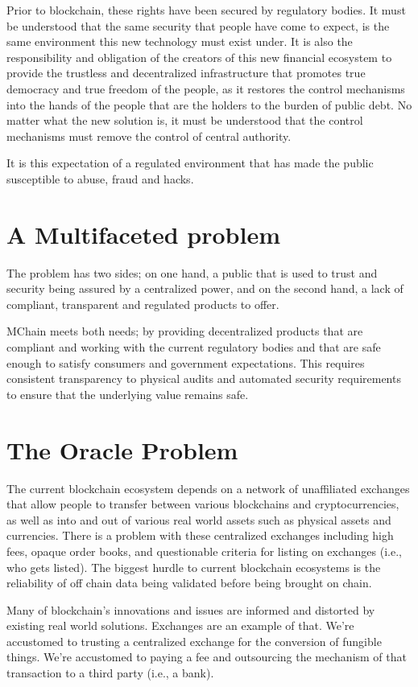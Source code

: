 \documentclass[11pt]{article}
\begin{document}
Prior to blockchain, these rights have been secured by regulatory bodies. It must be understood that the same security that people have come to expect, is the same environment this new technology must exist under. It is also the responsibility and obligation of the creators of this new financial ecosystem to provide the trustless and decentralized infrastructure that promotes true democracy and true freedom of the people, as it restores the control mechanisms into the hands of the people that are the holders to the burden of public debt. No matter what the new solution is, it must be understood that the control mechanisms must remove the control of central authority.


It is this expectation of a regulated environment that has made the public susceptible to abuse, fraud and hacks.


\section{A Multifaceted problem}

The problem has two sides; on one hand, a public that is used to trust and security being assured by a centralized power, and on the second hand, a lack of compliant, transparent and regulated products to offer.


MChain meets both needs; by providing decentralized products that are compliant and working with the current regulatory bodies and that are safe enough to satisfy consumers and government expectations. This requires consistent transparency to physical audits and automated security requirements to ensure that the underlying value remains safe.


\section{The Oracle Problem}

The current blockchain ecosystem depends on a network of unaffiliated exchanges that allow people to transfer between various blockchains and cryptocurrencies, as well as into and out of various real world assets such as physical assets and currencies. There is a problem with these centralized exchanges including high fees, opaque order books, and questionable criteria for listing on exchanges (i.e., who gets listed). The biggest hurdle to current blockchain ecosystems is the reliability of off chain data being validated before being brought on chain.


Many of blockchain's innovations and issues are informed and distorted by existing real world solutions. Exchanges are an example of that. We're accustomed to trusting a centralized exchange for the conversion of fungible things. We're accustomed to paying a fee and outsourcing the mechanism of that transaction to a third party (i.e., a bank).
\end{document}
